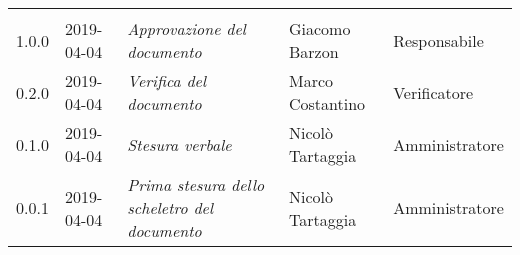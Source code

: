 \newpage 
\section*{}
	\begin{longtable}{C{2cm}|C{2.5cm}|C{4.5cm}|C{2.5cm}|C{3cm}}
	
	 &  &  &  &   \\
	\endhead
		
		1.0.0 & 2019-04-04 & \emph{Approvazione del documento} & Giacomo Barzon & Responsabile \\
		\hline
		
		0.2.0 & 2019-04-04 & \emph{Verifica del documento} & Marco Costantino & Verificatore \\
		\hline

		0.1.0 & 2019-04-04 & \emph{Stesura verbale} & Nicolò Tartaggia & Amministratore \\
		\hline
		
		0.0.1 & 2019-04-04 & \emph{Prima stesura dello scheletro del documento} & Nicolò Tartaggia & Amministratore \\
		
\end{longtable}


\clearpage